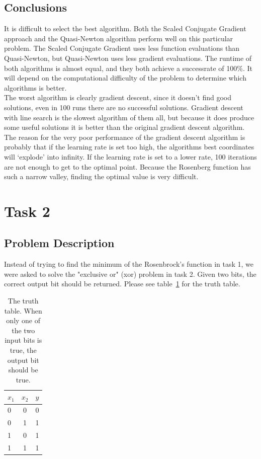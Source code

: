 \documentclass{article}
\begin{document}
\subsection{Conclusions}
It is difficult to select the best algorithm. Both the Scaled Conjugate Gradient approach and the Quasi-Newton algorithm perform well on this particular problem. The Scaled Conjugate Gradient uses less function evaluations than Quasi-Newton, but Quasi-Newton uses less gradient evaluations. The runtime of both algorithms is almost equal, and they both achieve a successrate of 100\%. It will depend on the computational difficulty of the problem to determine which algorithms is better. \\
The worst algorithm is clearly gradient descent, since it doesn't find good solutions, even in 100 runs there are no successful solutions. Gradient descent with line search is the slowest algorithm of them all, but because it does produce some useful solutions it is better than the original gradient descent algorithm.
The reason for the very poor performance of the gradient descent algorithm is probably that if the learning rate is set too high, the algorithms best coordinates will `explode' into infinity. If the learning rate is set to a lower rate, 100 iterations are not enough to get to the optimal point. Because the Rosenberg function has such a narrow valley, finding the optimal value is very difficult.

\newpage
\section{Task 2}
\subsection{Problem Description}
Instead of trying to find the minimum of the Rosenbrock's function in task 1, we were asked to solve the "exclusive or" (xor) problem in task 2. Given two bits, the correct output bit should be returned. Please see table~\ref{tab:tt} for the truth table.

\begin{table}[H]
	\centering
	\begin{tabular}{| l | c | r |}
		\hline
		$x_1$ & $x_2$ & $y$ \\ \hline
		0 & 0 & 0 \\ \hline
		0 & 1 & 1 \\ \hline
		1 & 0 & 1 \\ \hline
		1 & 1 & 1 \\ \hline
	\end{tabular}
	\caption{The truth table. When only one of the two input bits is true, the output bit should be true.}
	\label{tab:tt}
\end{table}
\end{document}
